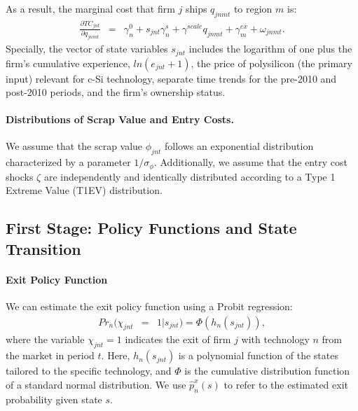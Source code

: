 \documentclass[12pt, letter]{article}
\begin{document}
As a result, the marginal cost that firm $j$ ships $q_{jnmt}$ to region $m$ is:
\begin{eqnarray}
  \frac{\partial TC_{jnt}}{\partial q_{jnmt}} &=&  \gamma_{n}^0 + s_{jnt} \gamma_n^s + \gamma^{scale} q_{jnmt}  +\gamma_{m}^{ex}  +\omega_{jnmt}. \label{eq:est_mc_q}
\end{eqnarray}
Specially, the vector of state variables $s_{jnt}$ includes the logarithm of one plus the firm's cumulative experience, $ln(e_{jnt}+1)$, the price of polysilicon (the primary input) relevant for c-Si technology, separate time trends for the pre-2010  and post-2010 periods, and the firm's ownership status.



\paragraph{Distributions of Scrap Value and Entry Costs.} 
We assume that the scrap value $\phi_{jnt}$ follows an exponential distribution characterized by a parameter $1/\sigma_{\phi}$. %
Additionally, we assume that the entry cost shocks $\zeta$ are independently and identically distributed according to a Type 1 Extreme Value (T1EV) distribution.

\subsection{First Stage: Policy Functions and State Transition}
\label{subsec:est_dynamic_first}

\paragraph{Exit Policy Function} 
We can estimate the exit policy function using a Probit regression:
\begin{eqnarray}
     Pr_n(\chi_{jnt} &=&1|s_{jnt})=\Phi(h_n(s_{jnt})), \label{eq:est_exit}
\end{eqnarray}
where the variable $\chi_{jnt}=1$ indicates the exit of firm $j$ with technology $n$ from the market in period $t$. Here, $h_n(s_{jnt})$ is a polynomial function of the states tailored to the specific technology, and $\Phi$ is the cumulative distribution function of a standard normal distribution. We use $\hat{p}^x_n(s)$ to refer to the estimated exit probability given state $s$.
\end{document}
